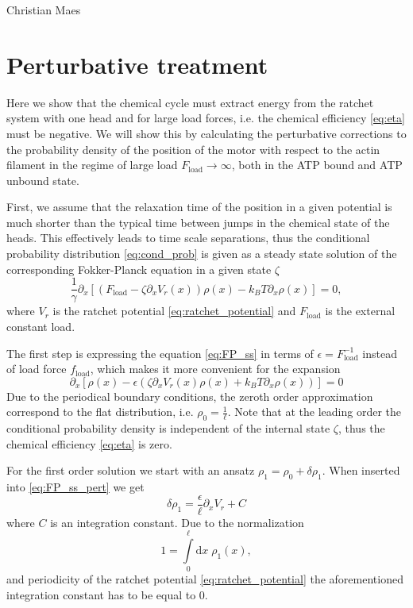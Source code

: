 \documentclass[aps,pre,twocolumn,showpacs,showkeys,superscriptaddress,floatfix]{revtex4-1}
\newcommand{\rmd}{{\mathrm d}}
\begin{document}
\begin{acknowledgments}
Christian Maes
\end{acknowledgments}

\appendix* 
\section{Perturbative treatment}
\label{sec:perturb}
Here we show that the chemical cycle must extract energy from the ratchet system with one head and for large load forces, 
i.e. the chemical efficiency \eqref{eq:eta} must be negative. 
We will show this by calculating the perturbative corrections to the probability density of the position of the motor with respect to the actin filament in the regime of large load $F_\text{load} \to \infty$, both in the ATP bound and ATP unbound state. 

First, we assume that the relaxation time of the position in a given potential is much shorter than the typical time between jumps in the chemical state of the heads. 
This effectively leads to time scale separations,
thus the conditional probability distribution \eqref{eq:cond_prob} is given as a steady state solution of the corresponding Fokker-Planck equation in a given state $\zeta$
\begin{equation}
\frac{1}{\gamma} \partial_x \left[ \left( F_\text{load} - \zeta \partial_x V_r(x) \right) \rho(x) - k_B T \partial_x \rho(x) \right] = 0 ,
\label{eq:FP_ss}
\end{equation}
where $V_r$ is the ratchet potential \eqref{eq:ratchet_potential} and $F_\text{load}$ is the external constant load. 

The first step is expressing the equation \eqref{eq:FP_ss} in terms of $\epsilon = F_\text{load}^{-1}$ instead of load force $f_\text{load}$,
which makes it more convenient for the expansion
\begin{equation}
\partial_x \left[ \rho(x) - \epsilon \left( \zeta \partial_x V_r(x) \rho(x) + k_B T \partial_x \rho(x) \right) \right] = 0 
\label{eq:FP_ss_pert}
\end{equation}
Due to the periodical boundary conditions, the zeroth order approximation correspond to the flat distribution, i.e. $\rho_0 = \frac{1}{\ell}$. 
Note that at the leading order the conditional probability density is independent of the internal state $\zeta$,
thus the chemical efficiency \eqref{eq:eta} is zero. 

For the first order solution we start with an ansatz $\rho_1 = \rho_0 + \delta\rho_1$. 
When inserted into \eqref{eq:FP_ss_pert} we get
\begin{equation*}
\delta\rho_1 = \frac{\epsilon}{\ell} \partial_x V_r + C
\end{equation*}
where $C$ is an integration constant.
Due to the normalization 
\begin{equation}
1 = \int\limits_0^\ell \rmd x \; \rho_1(x), 
\label{eq:normalization}
\end{equation}
and periodicity of the ratchet potential \eqref{eq:ratchet_potential} the aforementioned integration constant has to be equal to $0$.
\end{document}

